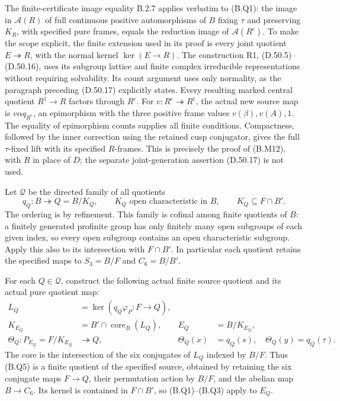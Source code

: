 The finite-certificate image equality B.2.7 applies verbatim
to (B.Q1): the image in $\mathcal A(R)$ of full continuous
positive automorphisms of $B$ fixing $\tau$ and preserving
$K_R$, with specified pure frames, equals the reduction image
of $\mathcal A(R^{\mathrm c})$.  To make the scope explicit,
the finite extension used in its proof is every joint
quotient $E\twoheadrightarrow R$, with the normal kernel
$\ker(E\to R)$.  The construction R1, (D.50.5)--(D.50.16),
uses its subgroup lattice and finite complex irreducible
representations without requiring solvability.  Its count
argument uses only normality, as the paragraph preceding
(D.50.17) explicitly states.  Every resulting marked
central quotient $R^\dagger\to R$ factors through
$R^{\mathrm c}$.  For $v:R^{\mathrm c}\twoheadrightarrow
R^\dagger$, the actual new source map is
$v\alpha q_{R^{\mathrm c}}$, an epimorphism with the three
positive frame values $v(\beta),v(A),1$.  The equality of
epimorphism counts supplies all finite conditions.  Compactness,
followed by the inner correction using the retained cusp
conjugator, gives the full $\tau$-fixed lift with its specified
$R$-frames.  This is precisely the proof of (B.M12), with $R$
in place of $D$; the separate joint-generation assertion
(D.50.17) is not used.

Let $\mathcal Q$ be the directed family of all quotients
\[
 q_Q:B\twoheadrightarrow Q=B/K_Q,
 \qquad K_Q\text{ open characteristic in }B,
 \qquad K_Q\subseteq F\cap B'.                                \tag{B.Q4}
\]
The ordering is by refinement.  This family is cofinal among
finite quotients of $B$: a finitely generated profinite group
has only finitely many open subgroups of each given index,
so every open subgroup contains an open characteristic
subgroup.  Apply this also to its intersection with $F\cap B'$.
In particular each quotient retains the specified maps to
$S_3=B/F$ and $C_6=B/B'$.

For each $Q\in\mathcal Q$, construct the following actual
finite source quotient and its actual pure quotient map:
\[
\begin{aligned}
 L_Q&=\ker(q_Q\varphi_P:F\longrightarrow Q),\\
 K_{E_Q}&=B'\cap\operatorname{core}_B(L_Q),
       &E_Q&=B/K_{E_Q},\\
 \Theta_Q:P_{E_Q}=F/K_{E_Q}&\twoheadrightarrow Q,
       &\Theta_Q(x)&=q_Q(s),\quad
         \Theta_Q(y)=q_Q(\tau).
\end{aligned}                                                   \tag{B.Q5}
\]
The core is the intersection of the six conjugates of $L_Q$
indexed by $B/F$.  Thus (B.Q5) is a finite quotient of the
specified source, obtained by retaining the six conjugate
maps $F\to Q$, their permutation action by $B/F$, and the
abelian map $B\to C_6$.  Its kernel is contained in
$F\cap B'$, so (B.Q1)--(B.Q3) apply to $E_Q$.

